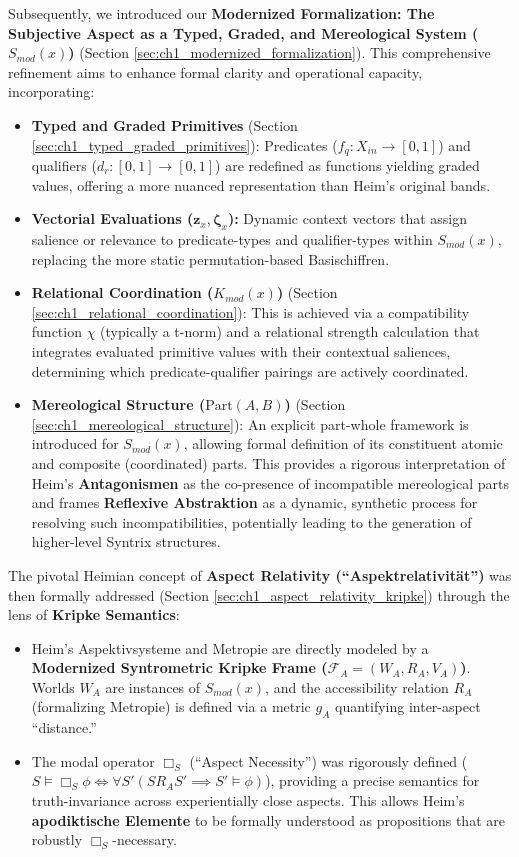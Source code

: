 \documentclass[
    12pt,              %
    a4paper,           %
    headings=normal,   %
    twoside=true,      %
    BCOR=8mm,          %
]{scrbook}
\newcommand{\q}[1]{\enquote{#1}}
\newcommand{\BoxS}{\Box_S}
\begin{document}
Subsequently, we introduced our \textbf{Modernized Formalization: The Subjective Aspect as a Typed, Graded, and Mereological System (\(S_{mod}(x)\))} (Section \ref{sec:ch1_modernized_formalization}). This comprehensive refinement aims to enhance formal clarity and operational capacity, incorporating:
\begin{itemize}
    \item   \textbf{Typed and Graded Primitives} (Section \ref{sec:ch1_typed_graded_primitives}): Predicates (\(f_q: X_{in} \to [0,1]\)) and qualifiers (\(d_r: [0,1] \to [0,1]\)) are redefined as functions yielding graded values, offering a more nuanced representation than Heim's original bands.
    \item   \textbf{Vectorial Evaluations (\(\mathbf{z}_x, \mathbf{\zeta}_x\)):} Dynamic context vectors that assign salience or relevance to predicate-types and qualifier-types within \(S_{mod}(x)\), replacing the more static permutation-based Basischiffren.
    \item   \textbf{Relational Coordination (\(K_{mod}(x)\))} (Section \ref{sec:ch1_relational_coordination}): This is achieved via a compatibility function \(\chi\) (typically a t-norm) and a relational strength calculation that integrates evaluated primitive values with their contextual saliences, determining which predicate-qualifier pairings are actively coordinated.
    \item   \textbf{Mereological Structure (\(\text{Part}(A,B)\))} (Section \ref{sec:ch1_mereological_structure}): An explicit part-whole framework is introduced for \(S_{mod}(x)\), allowing formal definition of its constituent atomic and composite (coordinated) parts. This provides a rigorous interpretation of Heim's \textbf{Antagonismen} as the co-presence of incompatible mereological parts and frames \textbf{Reflexive Abstraktion} as a dynamic, synthetic process for resolving such incompatibilities, potentially leading to the generation of higher-level Syntrix structures.
\end{itemize}

The pivotal Heimian concept of \textbf{Aspect Relativity (\q{Aspektrelativität})} was then formally addressed (Section \ref{sec:ch1_aspect_relativity_kripke}) through the lens of \textbf{Kripke Semantics}:
\begin{itemize}
    \item   Heim’s Aspektivsysteme and Metropie are directly modeled by a \textbf{Modernized Syntrometric Kripke Frame (\(\mathcal{F}_A = (W_A, R_A, V_A)\))}. Worlds \(W_A\) are instances of \(S_{mod}(x)\), and the accessibility relation \(R_A\) (formalizing Metropie) is defined via a metric \(g_A\) quantifying inter-aspect \q{distance.}
    \item   The modal operator \textbf{\(\BoxS\)} (\q{Aspect Necessity}) was rigorously defined (\(S \vDash \BoxS \phi \iff \forall S' (S R_A S' \implies S' \vDash \phi)\)), providing a precise semantics for truth-invariance across experientially close aspects. This allows Heim's \textbf{apodiktische Elemente} to be formally understood as propositions that are robustly \(\BoxS\)-necessary.
\end{itemize}
\end{document}
